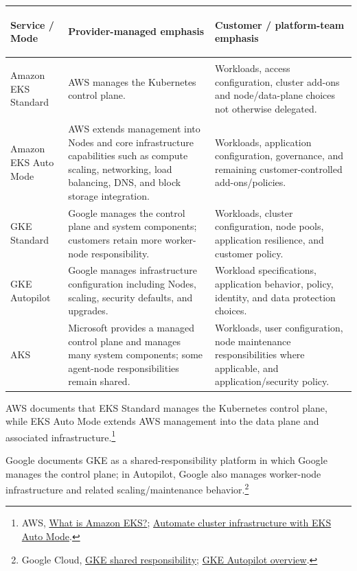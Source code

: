 \documentclass[11pt]{article}
\newcommand{\src}[2]{\href{#2}{#1}}
\begin{document}
\begin{table}[ht]
\centering
\small
\begin{tabularx}{\textwidth}{>{\bfseries\raggedright\arraybackslash}p{2.5cm} >{\raggedright\arraybackslash}X >{\raggedright\arraybackslash}X}
\toprule
Service / Mode & Provider-managed emphasis & Customer / platform-team emphasis \\
\midrule
Amazon EKS Standard & AWS manages the Kubernetes control plane. & Workloads, access configuration, cluster add-ons and node/data-plane choices not otherwise delegated. \\
Amazon EKS Auto Mode & AWS extends management into Nodes and core infrastructure capabilities such as compute scaling, networking, load balancing, DNS, and block storage integration. & Workloads, application configuration, governance, and remaining customer-controlled add-ons/policies. \\
GKE Standard & Google manages the control plane and system components; customers retain more worker-node responsibility. & Workloads, cluster configuration, node pools, application resilience, and customer policy. \\
GKE Autopilot & Google manages infrastructure configuration including Nodes, scaling, security defaults, and upgrades. & Workload specifications, application behavior, policy, identity, and data protection choices. \\
AKS & Microsoft provides a managed control plane and manages many system components; some agent-node responsibilities remain shared. & Workloads, user configuration, node maintenance responsibilities where applicable, and application/security policy. \\
\bottomrule
\end{tabularx}
\end{table}

AWS documents that EKS Standard manages the Kubernetes control plane, while EKS Auto Mode extends AWS management into the data plane and associated infrastructure.\footnote{AWS, \src{What is Amazon EKS?}{https://docs.aws.amazon.com/eks/latest/userguide/what-is-eks.html}; \src{Automate cluster infrastructure with EKS Auto Mode}{https://docs.aws.amazon.com/eks/latest/userguide/automode.html}.}

Google documents GKE as a shared-responsibility platform in which Google manages the control plane; in Autopilot, Google also manages worker-node infrastructure and related scaling/maintenance behavior.\footnote{Google Cloud, \src{GKE shared responsibility}{https://cloud.google.com/kubernetes-engine/docs/concepts/shared-responsibility}; \src{GKE Autopilot overview}{https://cloud.google.com/kubernetes-engine/docs/concepts/autopilot-overview}.}
\end{document}

